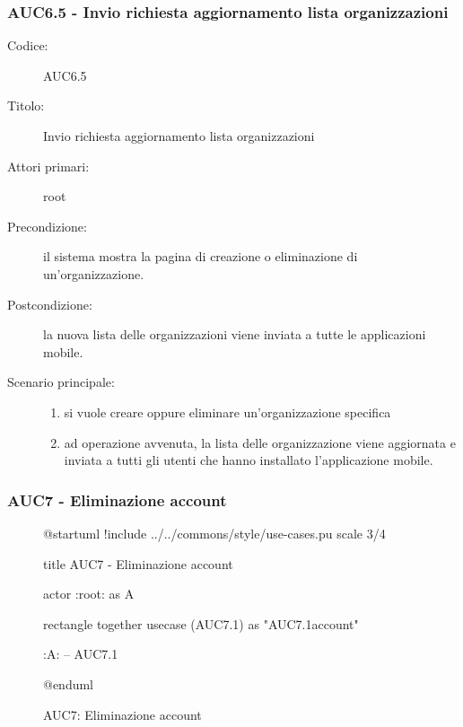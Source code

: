 \documentclass[casi-duso]{subfiles}
\begin{document}
\subsubsection{AUC6.5 - Invio richiesta aggiornamento lista organizzazioni}%
\label{subsub:AUC6.5}
\begin{description}
  \item[Codice:] AUC6.5
  \item[Titolo:] Invio richiesta aggiornamento lista organizzazioni
  \item[Attori primari:] root
  \item[Precondizione:] il sistema mostra la pagina di creazione o eliminazione di un'organizzazione.
  \item[Postcondizione:] la nuova lista delle organizzazioni viene inviata a tutte le applicazioni mobile.
  \item[Scenario principale:]
  \begin{enumerate}
    \item si vuole creare oppure eliminare un'organizzazione specifica
    \item ad operazione avvenuta, la lista delle organizzazione viene aggiornata e inviata a tutti gli utenti che hanno installato l'applicazione mobile.
  \end{enumerate}
\end{description}

\subsubsection{AUC7 - Eliminazione account}%
\label{subsub:AUC7}

\begin{figure}[h!] 
  \centering 
  \begin{plantuml}
  @startuml
  !include ../../commons/style/use-cases.pu
  scale 3/4

  title AUC7 - Eliminazione account

  actor :root: as A

  rectangle {
    together {
      usecase (AUC7.1) as "AUC7.1\nSeleziona account"
    }
  }

  :A: -- AUC7.1

  @enduml
  \end{plantuml} 
  \caption{AUC7: Eliminazione account} 
  \label{fig:auc7} 
\end{figure}
\end{document}
